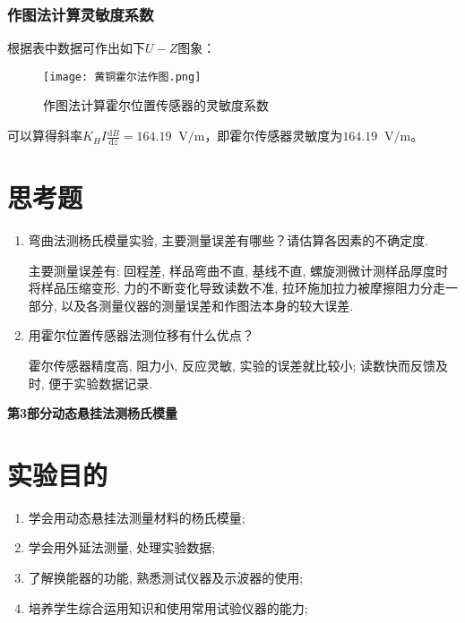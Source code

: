 \documentclass[11pt]{article}
\newcommand*{\unit}[1]{\mathop{}\!\mathrm{#1}}
\newcommand*{\deriv}[2]{\frac{\mathrm{d} #1}{\mathrm{d} {#2}}}
\newcommand{\chapter}[2]{\begin{center}\bf\Large{第#1部分\quad #2}\end{center}}
\begin{document}
\subsubsection{作图法计算灵敏度系数}

根据表中数据可作出如下$ U-Z $图象：

\begin{figure}[H]
    \centering
    \caption{作图法计算霍尔位置传感器的灵敏度系数}
    \texttt{[image: 黄铜霍尔法作图.png]}
\end{figure}

可以算得斜率$\displaystyle K_H I \deriv{B}{z}  = 164.19 \unit{V/m}$，即霍尔传感器灵敏度为$164.19\unit{V/m}$。

\section{思考题}

\begin{enumerate}

    \item 弯曲法测杨氏模量实验, 主要测量误差有哪些？请估算各因素的不确定度. 
   
    主要测量误差有: 回程差, 样品弯曲不直, 基线不直, 螺旋测微计测样品厚度时将样品压缩变形, 力的不断变化导致读数不准, 拉环施加拉力被摩擦阻力分走一部分, 以及各测量仪器的测量误差和作图法本身的较大误差.

    \item 用霍尔位置传感器法测位移有什么优点？
   
    霍尔传感器精度高, 阻力小, 反应灵敏, 实验的误差就比较小; 读数快而反馈及时, 便于实验数据记录.
   
\end{enumerate}


\setcounter{section}{0}
\chapter{3}{动态悬挂法测杨氏模量}

\section{实验目的}

\begin{enumerate}
    \item 学会用动态悬挂法测量材料的杨氏模量;
    \item 学会用外延法测量, 处理实验数据;
    \item 了解换能器的功能, 熟悉测试仪器及示波器的使用;
    \item 培养学生综合运用知识和使用常用试验仪器的能力;
\end{enumerate}
\end{document}
